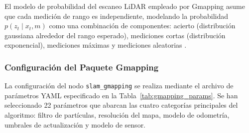 \documentclass[12pt,letterpaper]{article}
\begin{document}
El modelo de probabilidad del escaneo LiDAR empleado por Gmapping asume que cada medición de rango es independiente, modelando la probabilidad $p(z_t \mid x_t, m)$ como una combinación de componentes: acierto (distribución gaussiana alrededor del rango esperado), mediciones cortas (distribución exponencial), mediciones máximas y mediciones aleatorias \citep{thrun2005probabilistic}.

\subsubsection{Configuración del Paquete Gmapping}

La configuración del nodo \texttt{slam\_gmapping} se realiza mediante el archivo de parámetros YAML especificado en la Tabla~\ref{tab:gmapping_params}. Se han seleccionado 22 parámetros que abarcan las cuatro categorías principales del algoritmo: filtro de partículas, resolución del mapa, modelo de odometría, umbrales de actualización y modelo de sensor.
\end{document}
